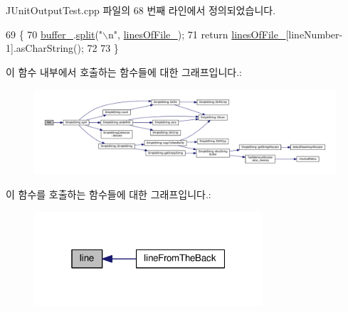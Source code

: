 J\+Unit\+Output\+Test.\+cpp 파일의 68 번째 라인에서 정의되었습니다.


\begin{DoxyCode}
69     \{
70         \hyperlink{class_file_for_j_unit_output_tests_ac4759f668b6ce24bb35987bfbdf19fa2}{buffer\_}.\hyperlink{class_simple_string_afefc06c420c72dacd7a4a0c82cd8b3ac}{split}(\textcolor{stringliteral}{"\(\backslash\)n"}, \hyperlink{class_file_for_j_unit_output_tests_acb3cf229d6cff602ef29a0d6412d1bbe}{linesOfFile\_});
71         \textcolor{keywordflow}{return} \hyperlink{class_file_for_j_unit_output_tests_acb3cf229d6cff602ef29a0d6412d1bbe}{linesOfFile\_}[lineNumber-1].asCharString();
72 
73     \}
\end{DoxyCode}


이 함수 내부에서 호출하는 함수들에 대한 그래프입니다.\+:
\nopagebreak
\begin{figure}[H]
\begin{center}
\leavevmode
\includegraphics[width=350pt]{class_file_for_j_unit_output_tests_a5d596290bf94a63abd273d45e1507382_cgraph}
\end{center}
\end{figure}




이 함수를 호출하는 함수들에 대한 그래프입니다.\+:
\nopagebreak
\begin{figure}[H]
\begin{center}
\leavevmode
\includegraphics[width=241pt]{class_file_for_j_unit_output_tests_a5d596290bf94a63abd273d45e1507382_icgraph}
\end{center}
\end{figure}



